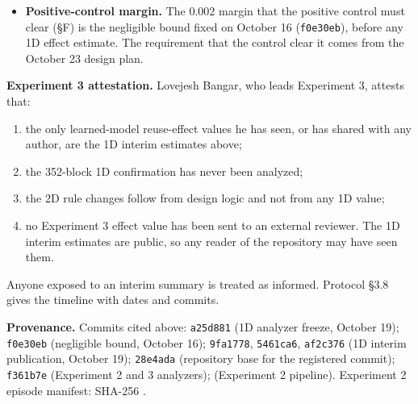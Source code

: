\documentclass[10pt,letterpaper]{article}
\providecommand{\tightlist}{\setlength{\itemsep}{0pt}\setlength{\parskip}{0pt}}
\begin{document}
\begin{itemize}
  published in the repository on October 19: the estimates
  and per-block values in
  \texttt{results/\allowbreak{}exposure\_\allowbreak{}interim\_\allowbreak{}analysis.json} and
  \texttt{results/\allowbreak{}exposure\_\allowbreak{}interim\_\allowbreak{}raw.json}
  (\texttt{af2c376}); the estimates, including the positive
  control, and the filtering analysis in FINDINGS §7 and
  \texttt{results/\allowbreak{}exposure\_\allowbreak{}interim\_\allowbreak{}filtering.json}
  (\texttt{9fa1778}); and a README summary of both
  (\texttt{5461ca6}). These interim results include the
  positive-control estimate. The 1D detector benchmarks and
  the lookup-predictor memory checks are also public. The 2D
  pilot reports in the repository contain only dispersions,
  counts, runtime and the coarse flag.
\item
  \textbf{Positive-control margin.} The 0.002 margin that
  the positive control must clear (§F) is the negligible
  bound fixed on October 16 (\texttt{f0e30eb}), before any
  1D effect estimate. The requirement that the control clear
  it comes from the October 23 design plan.
\end{itemize}

\textbf{Experiment 3 attestation.} Lovejesh Bangar, who
leads Experiment 3, attests that:

\begin{enumerate}
\def\labelenumi{\arabic{enumi}.}
\tightlist
\item
  the only learned-model reuse-effect values he has seen, or
  has shared with any author, are the 1D interim estimates
  above;
\item
  the 352-block 1D confirmation has never been analyzed;
\item
  the 2D rule changes follow from design logic and not from
  any 1D value;
\item
  no Experiment 3 effect value has been sent to an external
  reviewer. The 1D interim estimates are public, so any
  reader of the repository may have seen them.
\end{enumerate}

Anyone exposed to an interim summary is treated as informed.
Protocol §3.8 gives the timeline with dates and commits.

\textbf{Provenance.} Commits cited above: \texttt{a25d881}
(1D analyzer freeze, October 19); \texttt{f0e30eb}
(negligible bound, October 16); \texttt{9fa1778},
\texttt{5461ca6}, \texttt{af2c376} (1D interim publication,
October 19); \texttt{28e4ada} (repository base for the
registered commit); \texttt{f361b7e} (Experiment 2 and 3
analyzers);
\texttt{}
(Experiment 2 pipeline). Experiment 2 episode manifest:
SHA-256
\texttt{}.
\end{document}
